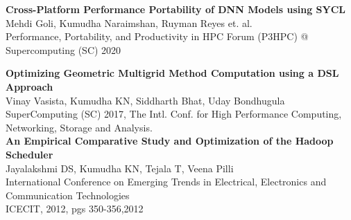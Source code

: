 \documentclass[a4paper,10pt]{article} %
\begin{document}
\textbf{Cross-Platform Performance Portability of DNN Models using SYCL} \\
\small{Mehdi Goli, Kumudha Naraimshan, Ruyman Reyes et. al.} \\
\small{ Performance, Portability, and Productivity in HPC Forum (P3HPC) @ Supercomputing (SC) 2020}

\textbf{Optimizing Geometric Multigrid Method Computation using a DSL Approach}\\
\small{Vinay Vasista, Kumudha KN, Siddharth Bhat, Uday Bondhugula} \\
\small{SuperComputing (SC) 2017, The Intl. Conf. for High Performance Computing, Networking, Storage and Analysis. } \\


\textbf{An Empirical Comparative Study and Optimization of the Hadoop Scheduler} \\
\small{Jayalakshmi DS, Kumudha KN, Tejala T, Veena Pilli}\\
\small{International Conference on Emerging Trends in Electrical, Electronics and 
Communication Technologies \\ ICECIT, 2012, pgs 350-356,2012}
\\
\end{document}
